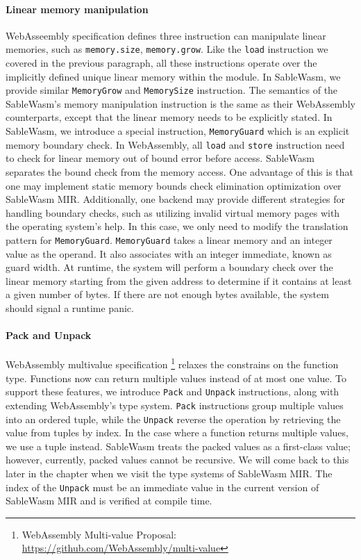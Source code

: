 \paragraph{Linear memory manipulation} WebAsseembly specification defines three instruction can manipulate linear memories, such as \texttt{memory.size}, \texttt{memory.grow}. Like the \texttt{load} instruction we covered in the previous paragraph, all these instructions operate over the implicitly defined unique linear memory within the module. In SableWasm, we provide similar \texttt{MemoryGrow} and \texttt{MemorySize} instruction. The semantics of the SableWasm's memory manipulation instruction is the same as their WebAssembly counterparts, except that the linear memory needs to be explicitly stated. In SableWasm, we introduce a special instruction, \texttt{MemoryGuard} which is an explicit memory boundary check. In WebAssembly, all \texttt{load} and \texttt{store} instruction need to check for linear memory out of bound error before access. SableWasm separates the bound check from the memory access. One advantage of this is that one may implement static memory bounds check elimination optimization over SableWasm MIR. Additionally, one backend may provide different strategies for handling boundary checks, such as utilizing invalid virtual memory pages with the operating system's help. In this case, we only need to modify the translation pattern for \texttt{MemoryGuard}. \texttt{MemoryGuard} takes a linear memory and an integer value as the operand. It also associates with an integer immediate, known as guard width. At runtime, the system will perform a boundary check over the linear memory starting from the given address to determine if it contains at least a given number of bytes. If there are not enough bytes available, the system should signal a runtime panic.

\paragraph{Pack and Unpack} WebAssembly multivalue specification \footnote{WebAssembly Multi-value Proposal: \url{https://github.com/WebAssembly/multi-value}} relaxes the constrains on the function type. Functions now can return multiple values instead of at most one value. To support these features, we introduce \texttt{Pack} and \texttt{Unpack} instructions, along with extending WebAssembly's type system. \texttt{Pack} instructions group multiple values into an ordered tuple, while the \texttt{Unpack} reverse the operation by retrieving the value from tuples by index. In the case where a function returns multiple values, we use a tuple instead. SableWasm treats the packed values as a first-class value; however, currently, packed values cannot be recursive. We will come back to this later in the chapter when we visit the type systems of SableWasm MIR. The index of the \texttt{Unpack} must be an immediate value in the current version of SableWasm MIR and is verified at compile time. 


